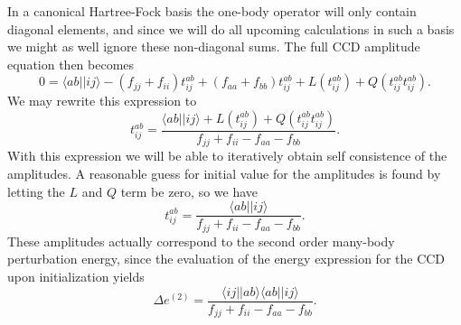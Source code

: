 In a canonical Hartree-Fock basis the one-body operator will only
contain diagonal elements, and since we will do all upcoming
calculations in such a basis we might as well ignore these non-diagonal sums. The full CCD amplitude equation then becomes
\begin{equation}
0 =\langle ab \vert \vert ij \rangle -(f_{jj} + f_{ii}) t_{ij}^{ab}+(f_{aa} + f_{bb}) t_{ij}^{ab}+L(t^{ab}_{ij}) + Q(t^{ab}_{ij}t^{ab}_{ij}).
\end{equation}
We may rewrite this expression to
\begin{equation}
 t_{ij}^{ab} =\frac{\langle ab \vert \vert ij \rangle+L(t^{ab}_{ij}) + Q(t^{ab}_{ij}t^{ab}_{ij})}{f_{jj} + f_{ii} - f_{aa} - f_{bb} }.
\end{equation}
With this expression we will be able to iteratively obtain self
consistence of the amplitudes. A reasonable guess for initial value
for the amplitudes is found by letting the $L$ and $Q$ term be zero,
so we have
\begin{equation}
 t_{ij}^{ab} =\frac{\langle ab \vert \vert ij \rangle}{f_{jj} + f_{ii} - f_{aa} - f_{bb} }.
\label{eqn:initialguess}
\end{equation}
These amplitudes actually correspond to the second order many-body perturbation energy, since
the evaluation of the energy expression for the CCD upon initialization yields
\begin{equation}
\Delta e^{(2)} =\frac{\langle ij \vert \vert ab \rangle \langle ab \vert \vert ij \rangle}{f_{jj} + f_{ii} - f_{aa} - f_{bb} }.
\label{eqn:initialenergy}
\end{equation}



